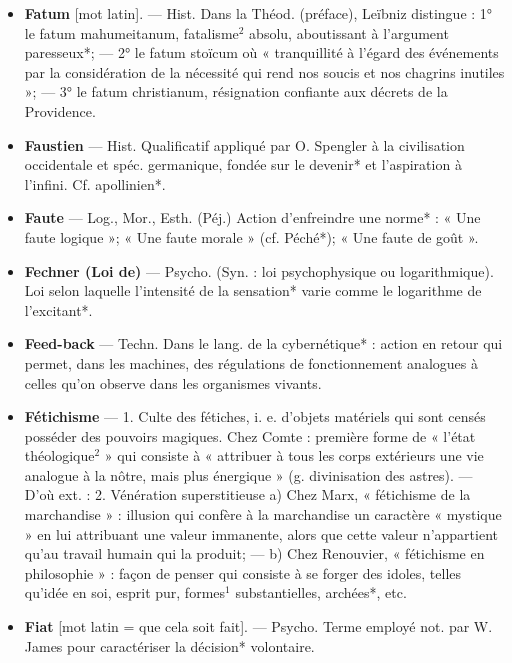 \begin{itemize}[leftmargin=1cm, label=, itemsep=1pt]
\item {\bf Fatum} [mot latin]. — Hist. Dans la
Théod. (préface), Leïbniz distingue : 1° le fatum mahumeitanum,
fatalisme$^2$ absolu, aboutissant à l’argument paresseux*; — 2° le fatum
stoïcum où « tranquillité à l'égard des événements par la
considération de la nécessité qui
rend nos soucis et nos chagrins inutiles »; — 3° le fatum christianum,
résignation confiante aux décrets de
la Providence.

\item {\bf Faustien} — Hist. Qualificatif appliqué
par O. Spengler à la civilisation
occidentale et spéc. germanique,
fondée sur le devenir* et l’aspiration à l'infini. Cf. apollinien*.

\item {\bf Faute} — Log., Mor., Esth. (Péj.) Action
d’enfreindre une norme* : « Une
faute logique »; « Une faute morale »
(cf. Péché*); « Une faute de goût ».

\item {\bf Fechner (Loi de)} — Psycho. (Syn. :
loi psychophysique ou logarithmique).
Loi selon laquelle l’intensité de la
sensation* varie comme le logarithme de l’excitant*.

\item {\bf Feed-back} — Techn. Dans le lang. de
la cybernétique* : action en retour
qui permet, dans les machines, des
régulations de fonctionnement analogues à celles qu’on observe dans
les organismes vivants.

\item {\bf Fétichisme} — 1. Culte des fétiches,
i. e. d’objets matériels qui sont
censés posséder des pouvoirs magiques. Chez Comte : première forme
de « l’état théologique$^2$ » qui consiste
à « attribuer à tous les corps extérieurs une vie analogue à la nôtre,
mais plus énergique » (g. divinisation des astres). — D'où ext. : 2. Vénération superstitieuse a) Chez
Marx, « fétichisme de la marchandise » : illusion qui confère à la marchandise un caractère « mystique »
en lui attribuant une valeur immanente, alors que cette valeur n’appartient qu'au travail humain qui la
produit; — b) Chez Renouvier,
« fétichisme en philosophie » : façon
de penser qui consiste à se forger
des idoles, telles qu’idée en soi,
esprit pur, formes$^1$ substantielles,
archées*, etc.

\item {\bf Fiat} [mot latin = que cela soit fait].
— Psycho. Terme employé not. par
W. James pour caractériser la décision* volontaire.


\end{itemize}
